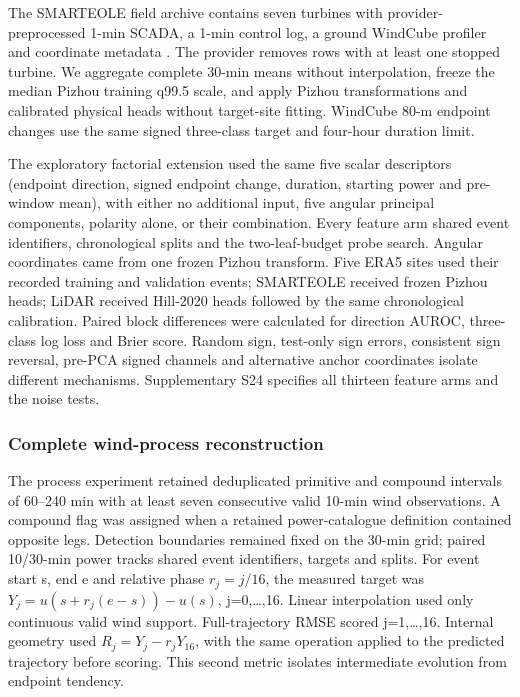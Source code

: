 \documentclass[preprint,12pt]{elsarticle}
\begin{document}
The SMARTEOLE field archive contains seven turbines with provider-preprocessed 1-min SCADA, a 1-min control log, a ground WindCube profiler and coordinate metadata \citep{smarteole2022}. The provider removes rows with at least one stopped turbine. We aggregate complete 30-min means without interpolation, freeze the median Pizhou training q99.5 scale, and apply Pizhou transformations and calibrated physical heads without target-site fitting. WindCube 80-m endpoint changes use the same signed three-class target and four-hour duration limit.

The exploratory factorial extension used the same five scalar descriptors (endpoint direction, signed endpoint change, duration, starting power and pre-window mean), with either no additional input, five angular principal components, polarity alone, or their combination. Every feature arm shared event identifiers, chronological splits and the two-leaf-budget probe search. Angular coordinates came from one frozen Pizhou transform. Five ERA5 sites used their recorded training and validation events; SMARTEOLE received frozen Pizhou heads; LiDAR received Hill-2020 heads followed by the same chronological calibration. Paired block differences were calculated for direction AUROC, three-class log loss and Brier score. Random sign, test-only sign errors, consistent sign reversal, pre-PCA signed channels and alternative anchor coordinates isolate different mechanisms. Supplementary S24 specifies all thirteen feature arms and the noise tests.

\subsubsection{Complete wind-process reconstruction}\label{complete-wind-process-reconstruction}

The process experiment retained deduplicated primitive and compound intervals of 60--240 min with at least seven consecutive valid 10-min wind observations. A compound flag was assigned when a retained power-catalogue definition contained opposite legs. Detection boundaries remained fixed on the 30-min grid; paired 10/30-min power tracks shared event identifiers, targets and splits. For event start s, end e and relative phase \(r_j=j/16\), the measured target was \(Y_j=u(s+r_j(e-s))-u(s)\), j=0,\ldots,16. Linear interpolation used only continuous valid wind support. Full-trajectory RMSE scored j=1,\ldots,16. Internal geometry used \(R_j=Y_j-r_jY_{16}\), with the same operation applied to the predicted trajectory before scoring. This second metric isolates intermediate evolution from endpoint tendency.
\end{document}
